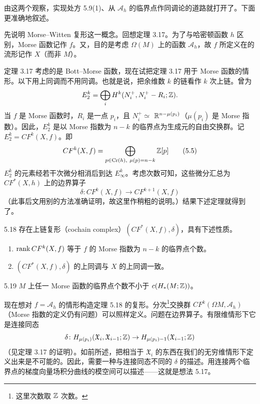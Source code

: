 由这两个观察，实现处方 5.9(1)、从 $\mathcal{A}_h$ 的临界点作同调论的道路就打开了。下面更准确地叙述。

先说明 Morse–Witten 复形这一概念。回想定理 3.17。为了与哈密顿函数 $h$ 区别，Morse 函数记作 $f$。又，目的是考虑 $\Omega(M)$ 上的函数 $\mathcal{A}_h$，故 $f$ 所定义在的流形记作 $X$（而非 $M$）。

定理 3.17 考虑的是 Bott–Morse 函数，现在试把定理 3.17 用于 Morse 函数的情形。以下用上同调而不用同调。也就是说，把余维数 $k$ 的链看作 $k$ 次上链。曾为
\[
  E_2^k=\bigoplus_iH^k(N_i^{+},N_i^{+}-R_i;\mathbb{Z}).
\]
当 $f$ 是 Morse 函数时，$R_i$ 是一点 $p_i$，且 $N_i^{+}\simeq$
$\mathbb{R}^{n-\mu(p_i)}$（$\mu(p_i)$ 是 Morse 指数）。因此，$E_2^k$ 是以 Morse 指数为 $n-k$ 的临界点为生成元的自由交换群。记 $E_2^k=CF^k(X,f)$。即
\begin{equation}
  CF^k(X,f)=\bigoplus_{p\in\operatorname{Cr}(h),\ \mu(p)=n-k}\Z[p] \tag{5.5}
\end{equation}
$E_2^k$ 的元素经若干次微分相消后到达 $E_\infty^k$。考虑次数可知，这些微分汇总为 $CF^*(X,h)$ 上的边界算子
\[
  \delta\colon CF^k(X,f)\to CF^{k+1}(X,f)
\]
（此事后文用别的方法准确证明，故这里作稍粗的说明。）结果下述定理就得到了。


\begin{theorem}{5.18}
  存在上链复形（cochain complex）$(CF^*(X,f),\delta)$，具有下述性质。
  \begin{enumerate}[label=（\arabic*）,leftmargin=2.8em]
    \item $\operatorname{rank} CF^k(X,f)$ 等于 $f$ 的 Morse 指数为 $n-k$ 的临界点个数。
    \item $(CF^*(X,f),\delta)$ 的上同调与 $X$ 的上同调一致。
  \end{enumerate}
\end{theorem}

\begin{corollary}{5.19}
  $M$ 上任一 Morse 函数的临界点个数不小于 $c(H_*(M;\mathbb{Z}))$。
\end{corollary}

现在想对 $f=\mathcal{A}_h$ 的情形构造定理 5.18 的复形。分次\footnote{这里次数取 $\mathbb{Z}$ 次数。}交换群 $CF^k(\Omega M,\mathcal{A}_h)$（Morse 指数的定义仍有问题）可以照样定义。问题在边界算子。有限维情形下它是连接同态
\[
  \delta\colon H_{\mu(p_i)}(\mathfrak{X}_i,\mathfrak{X}_{i-1};\mathbb{Z})\to H_{\mu(p_i)-1}(\mathfrak{X}_{i-1};\mathbb{Z})
\]
（见定理 3.17 的证明）。如前所述，把相当于 $\mathfrak{X}_i$ 的东西在我们的无穷维情形下定义出来是不可能的。因此，需要一种与连接同态不同的 $\delta$ 的描述。用连接两个临界点的梯度向量场积分曲线的模空间可以描述——这就是想法 5.17。

